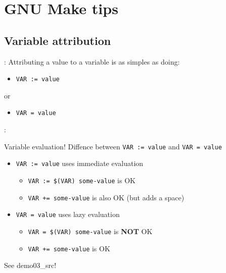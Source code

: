 \section{GNU Make tips}

\subsection{Variable attribution}
\begin{frame}{\secname: \small\subsecname\normalsize}
    Attributing a value to a variable is as simples as doing:

    \begin{itemize}
        \item \texttt{VAR := value}
    \end{itemize}

    or

    \begin{itemize}
        \item \texttt{VAR = value}
    \end{itemize}
\end{frame}

\begin{frame}{\secname: \small\subsecname\normalsize}
    \begin{block}{Variable evaluation!}
        Diffence between \texttt{VAR := value} and \texttt{VAR = value}
    \end{block}

    \begin{itemize}
        \item \texttt{VAR := value} uses immediate evaluation
        \begin{itemize}
            \item \texttt{VAR := \$(VAR) some-value} is OK
            \item \texttt{VAR += some-value} is also OK (but adds a space)
        \end{itemize}
        \item \texttt{VAR = value} uses lazy evaluation
        \begin{itemize}
            \item \texttt{VAR = \$(VAR) some-value} is \textbf{NOT} OK
            \item \texttt{VAR += some-value} is OK
        \end{itemize}
    \end{itemize}

    See demo03\_src!

\end{frame}

